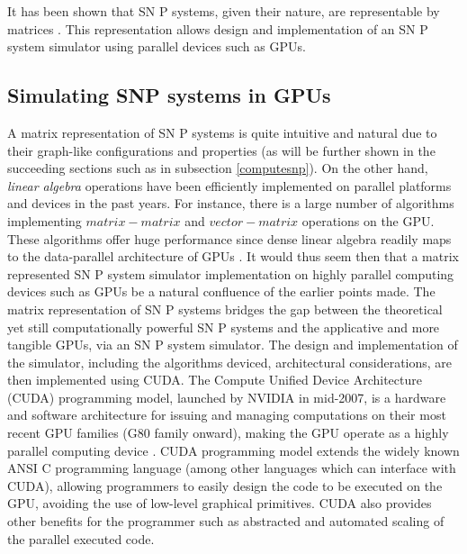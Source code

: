 \documentclass{svmultm}
\newcommand{\sredmark}[2]{\color{red} \sout{#1} #2 \color{black}}
\begin{document}
It has been shown that SN P systems, given their nature, are representable by matrices \cite{snpbrain}\cite{snpmat}. This representation allows design and implementation of an SN P system simulator using parallel devices such as GPUs. 


\subsection{Simulating SNP systems in  {GPUs}}
A matrix representation of SN P systems is quite intuitive and natural due to their graph-like configurations and properties (as will be further shown in the succeeding sections such as in subsection \ref{computesnp}). 
{On the other hand, \textit{linear algebra} operations have been efficiently implemented on parallel platforms and devices in the past years. For instance, there is a large number of algorithms implementing $matrix-matrix$ and $vector-matrix$ operations on the GPU. These algorithms offer huge performance since dense linear algebra readily maps to the data-parallel architecture of GPUs \cite{matrixgpu1,matrixgpu2}}.
It would thus seem then that a matrix represented SN P system simulator implementation on highly parallel computing devices such as  {GPUs} be a natural confluence of the earlier points made. The matrix representation of SN P systems bridges the gap between the theoretical yet still computationally powerful SN P systems and the applicative and more tangible  {GPUs}, via an SN P system simulator. 
{The design and implementation of the simulator, including the algorithms deviced, architectural considerations, are then implemented using CUDA. The Compute Unified Device Architecture (CUDA) programming model, launched by NVIDIA in mid-2007, is a hardware and software architecture for issuing and managing computations on their most recent GPU families (G80 family onward), making the GPU operate as a highly parallel computing device \cite{cudapage}. CUDA programming model extends the widely known ANSI C programming language (among other languages which can interface with CUDA), allowing programmers to easily design the code to be executed on the GPU, avoiding the use of low-level graphical primitives. CUDA also provides other benefits for the programmer such as abstracted and automated scaling of the parallel executed code.}
\end{document}
